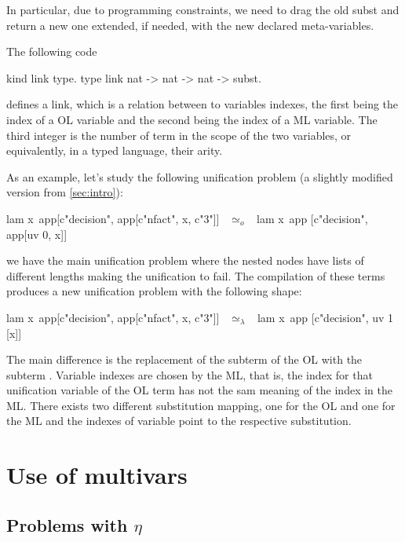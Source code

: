 \documentclass[sigconf,natbib=false]{acmart}
\newcommand{\UnifRel}{\ensuremath{\simeq}}
\newcommand{\Uo}{\ensuremath{\UnifRel_o}\xspace}
\newcommand{\Ue}{\ensuremath{\UnifRel_\lambda}\xspace}
\begin{document}
In particular, due to programming constraints, we need to drag the old subst and
return a new one extended, if needed, with the new declared meta-variables.

The following code
%
\begin{elpicode}
  kind link type.
  type link nat -> nat -> nat -> subst.
\end{elpicode}
%
\noindent
defines a link, which is a relation between to variables indexes, the first
being the index of a OL variable and the second being the index of a ML
variable. The third integer is the number of term in the
scope of the two variables, or equivalently, in a typed language, their arity. 

As an example, let's study the following unification problem (a slightly 
modified version from \cref{sec:intro}):

\begin{elpicode}
  lam x\ app[c"decision", app[c"nfact", x, c"3"]] ~\Uo~
    lam x\ app [c"decision", app[uv 0, x]]
\end{elpicode}

\noindent
we have the main unification problem where the nested  nodes have
lists of different lengths making the unification to fail. The compilation of 
these terms produces a new unification problem with the following shape:

\begin{elpicode}
  lam x\ app[c"decision", app[c"nfact", x, c"3"]] ~\Ue~ 
    lam x\ app [c"decision", uv 1 [x]]
\end{elpicode}

\noindent
The main difference is the replacement of the subterm  of
the OL with the subterm . Variable indexes are chosen by the
ML, that is, the index  for that unification variable of the OL term
has not the sam meaning of the index  in the ML. There exists two
different substitution mapping, one for the OL and one for the ML and the indexes
of variable point to the respective substitution.

\section{Use of multivars}

\subsection{Problems with $\eta$}
\end{document}
